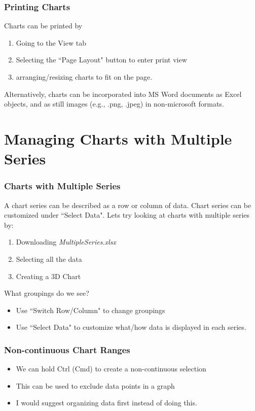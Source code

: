 \documentclass[12pt]{beamer}
\begin{document}
	\begin{frame}
		\frametitle{Printing Charts}
		Charts can be printed by
		\begin{enumerate}
			\item Going to the View tab
			\item Selecting the ``Page Layout" button to enter print view
			\item arranging/resizing charts to fit on the page.
		\end{enumerate}
			Alternatively, charts can be incorporated into MS Word documents as Excel objects, and as still images (e.g., .png, .jpeg) in non-microsoft formats.
	\end{frame}
	
\section{Managing Charts with Multiple Series}
	\begin{frame}
		\frametitle{Charts with Multiple Series}
		A chart series can be described as a row or column of data.
		Chart series can be customized under ``Select Data".
		Lets try looking at charts with multiple series by:
		\begin{enumerate}
			\item Downloading \textit{MultipleSeries.xlsx}
			\item Selecting all the data
			\item Creating a 3D Chart
		\end{enumerate}
	What groupings do we see?
	\begin{itemize}
		\item Use ``Switch Row/Column" to change groupings
		\item Use ``Select Data" to customize what/how data is displayed in each series. 
	\end{itemize}
	\end{frame}

	\begin{frame}
		\frametitle{Non-continuous Chart Ranges}
		\begin{itemize}
			\item We can hold Ctrl (Cmd) to create a non-continuous selection
			\item This can be used to exclude data points in a graph
			\item I would suggest organizing data first instead of doing this.
		\end{itemize} 
	\end{frame}
\end{document}
